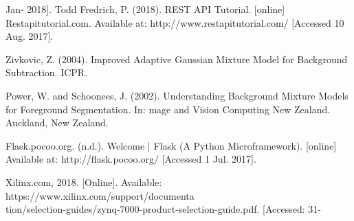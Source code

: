 \documentclass[12pt,a4paper]{report}
\begin{document}
\begin{thebibliography}{10}
Jan- 2018].
Todd Fredrich, P. (2018). REST API Tutorial. [online] Restapitutorial.com. Available at: http://www.restapitutorial.com/ [Accessed 10 Aug. 2017].

Zivkovic, Z. (2004). Improved Adaptive Gaussian Mixture Model for Background Subtraction. ICPR.

Power, W. and Schoonees, J. (2002). Understanding Background Mixture Models for Foreground Segmentation. In: mage and Vision Computing New Zealand. Auckland, New Zealand.

Flask.pocoo.org. (n.d.). Welcome | Flask (A Python Microframework). [online] Available at: http://flask.pocoo.org/ [Accessed 1 Jul. 2017].

Xilinx.com, 2018. [Online]. Available: https://www.xilinx.com/support/documenta\\tion/selection-guides/zynq-7000-product-selection-guide.pdf. [Accessed: 31- 

\end{thebibliography}
\end{document}
